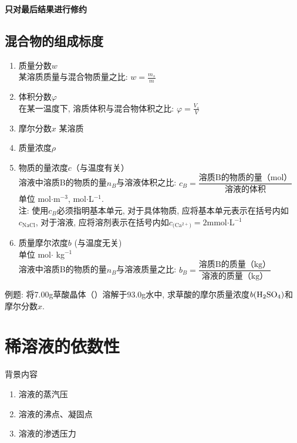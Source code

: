 \documentclass[12pt, a4paper, oneside]{ctexbook}
\begin{document}
\textbf{只对最后结果进行修约}



\section*{混合物的组成标度}
\begin{enumerate}
    \item 质量分数$w$ \\某溶质质量与混合物质量之比: $w = \frac{m_s}{m}$
    \item 体积分数$\varphi$\\在某一温度下, 溶质体积与混合物体积之比: $\varphi = \frac{V_s}{V}$
    \item 摩尔分数$x$ 某溶质
    \item 质量浓度$\rho $
    \item 物质的量浓度$c$（与温度有关）\\溶液中溶质B的物质的量$n_B$与溶液体积之比: $c_B = \dfrac{\text{溶质B的物质的量（mol）}}{\text{溶液的体积}}$\\
            单位 mol$\cdot$m$^{-3}$, mol$\cdot$L$^{-1}$.\\
            注: 使用$c_B$必须指明基本单元, 对于具体物质, 应将基本单元表示在括号内如$c_{\text{NaCl}}$, 对于溶液, 应将溶剂表示在括号内如$c_{\text{(Ca$^{2+}$)}} = 2$mmol$\cdot$L$^{-1}$
    \item 质量摩尔浓度$b$ (与温度无关)\\单位 mol$\cdot$ kg$^{-1}$\\
            溶液中溶质B的物质的量$n_B$与溶液质量之比: $b_B = \dfrac{\text{溶质B的质量（kg）}}{\text{溶液的质量（kg）}}$
\end{enumerate}
例题: 将7.00g草酸晶体（）溶解于93.0g水中, 求草酸的摩尔质量浓度$b(\ce{H2SO4})$和摩尔分数$x$.

\chapter{稀溶液的依数性}
背景内容
\begin{enumerate}
    \item 溶液的蒸汽压
    \item 溶液的沸点、凝固点
    \item 溶液的渗透压力
\end{enumerate}
\newpage
\end{document}
